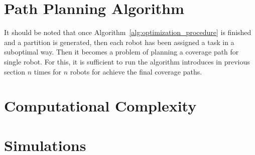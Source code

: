 \documentclass[../main.tex]{subfiles}
\begin{document}
\section{Path Planning Algorithm}
It should be noted that once Algorithm~\ref{alg:optimization_procedure} is finished and a partition is generated, then each robot has been assigned a task in a suboptimal way. Then it becomes a problem of planning a coverage path for single robot. For this, it is sufficient to run the algorithm introduces in previous section $n$ times for $n$ robots for achieve the final coverage paths.



\section{Computational Complexity}

\section{Simulations}
\end{document}
